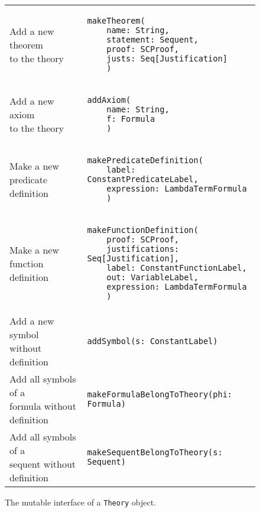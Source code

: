 {\begin{figure}[hp]
\begin{center}
\begin{tabular}{l|l}
          \makecell[l]{Add a new theorem    \\to the theory} &
          \begin{lstlisting}
makeTheorem(
	name: String,
	statement: Sequent,
	proof: SCProof,
	justs: Seq[Justification]
	)
\end{lstlisting}
          \\ %

          \makecell[l]{Add a new axiom      \\ to the theory} &
          \begin{lstlisting}
addAxiom(
	name: String,
	f: Formula
	)
\end{lstlisting}
          \\ %

          \makecell[l]{Make a new           \\predicate definition} &
          \begin{lstlisting}
makePredicateDefinition(
	label: ConstantPredicateLabel,
	expression: LambdaTermFormula
	)
\end{lstlisting}
          \\ %

          \makecell[l]{Make a new           \\function definition} &
          \begin{lstlisting}
makeFunctionDefinition(
	proof: SCProof,
	justifications: Seq[Justification],
	label: ConstantFunctionLabel,
	out: VariableLabel,
	expression: LambdaTermFormula
	)
\end{lstlisting}
          \\ %

          \makecell[l]{Add a new symbol     \\without definition} &
          \begin{lstlisting}
addSymbol(s: ConstantLabel)
\end{lstlisting}
          \\ %

          \makecell[l]{Add all symbols of a \\formula without definition} &
          \begin{lstlisting}
makeFormulaBelongToTheory(phi: Formula)
\end{lstlisting}
          \\ %

          \makecell[l]{Add all symbols of a \\sequent without definition} &
          \begin{lstlisting}
makeSequentBelongToTheory(s: Sequent)
\end{lstlisting}
          \\ %
        \end{tabular}
        \caption{The mutable interface of a \lstinline{Theory}{} object.}
        \label{fig:theorysetters}
      \end{center}
    \end{figure}



}
